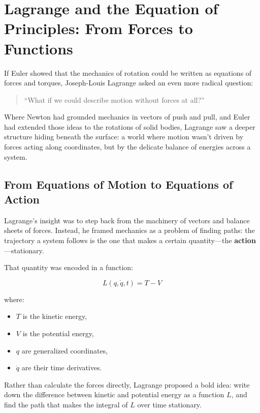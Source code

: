 \section{Lagrange and the Equation of Principles: From Forces to Functions}

If Euler showed that the mechanics of rotation could be written as equations of forces and torques,  
Joseph-Louis Lagrange asked an even more radical question:

\begin{quote}
“What if we could describe motion without forces at all?”
\end{quote}

Where Newton had grounded mechanics in vectors of push and pull, and Euler had extended those ideas to the rotations of solid bodies,  
Lagrange saw a deeper structure hiding beneath the surface:  
a world where motion wasn’t driven by forces acting along coordinates, but by the delicate balance of energies across a system.

\bigskip

\subsection*{From Equations of Motion to Equations of Action}

Lagrange’s insight was to step back from the machinery of vectors and balance sheets of forces.  
Instead, he framed mechanics as a problem of finding paths:  
the trajectory a system follows is the one that makes a certain quantity—the \textbf{action}—stationary.

That quantity was encoded in a function:

\[
L(q, \dot{q}, t) = T - V
\]

where:

\begin{itemize}
  \item \( T \) is the kinetic energy,
  \item \( V \) is the potential energy,
  \item \( q \) are generalized coordinates,
  \item \( \dot{q} \) are their time derivatives.
\end{itemize}

Rather than calculate the forces directly, Lagrange proposed a bold idea:  
write down the difference between kinetic and potential energy as a function \( L \), and find the path that makes the integral of \( L \) over time stationary.

